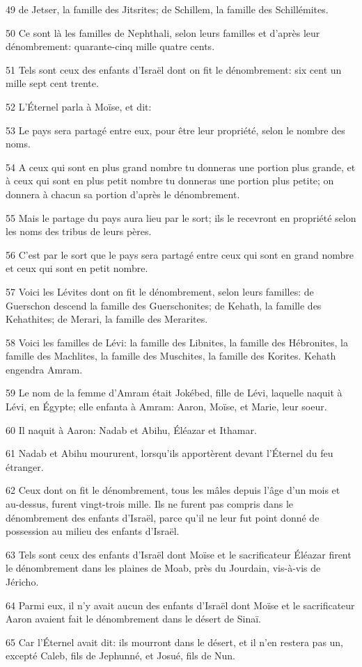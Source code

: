 \par 49 de Jetser, la famille des Jitsrites; de Schillem, la famille des Schillémites.
\par 50 Ce sont là les familles de Nephthali, selon leurs familles et d'après leur dénombrement: quarante-cinq mille quatre cents.
\par 51 Tels sont ceux des enfants d'Israël dont on fit le dénombrement: six cent un mille sept cent trente.
\par 52 L'Éternel parla à Moïse, et dit:
\par 53 Le pays sera partagé entre eux, pour être leur propriété, selon le nombre des noms.
\par 54 A ceux qui sont en plus grand nombre tu donneras une portion plus grande, et à ceux qui sont en plus petit nombre tu donneras une portion plus petite; on donnera à chacun sa portion d'après le dénombrement.
\par 55 Mais le partage du pays aura lieu par le sort; ils le recevront en propriété selon les noms des tribus de leurs pères.
\par 56 C'est par le sort que le pays sera partagé entre ceux qui sont en grand nombre et ceux qui sont en petit nombre.
\par 57 Voici les Lévites dont on fit le dénombrement, selon leurs familles: de Guerschon descend la famille des Guerschonites; de Kehath, la famille des Kehathites; de Merari, la famille des Merarites.
\par 58 Voici les familles de Lévi: la famille des Libnites, la famille des Hébronites, la famille des Machlites, la famille des Muschites, la famille des Korites. Kehath engendra Amram.
\par 59 Le nom de la femme d'Amram était Jokébed, fille de Lévi, laquelle naquit à Lévi, en Égypte; elle enfanta à Amram: Aaron, Moïse, et Marie, leur soeur.
\par 60 Il naquit à Aaron: Nadab et Abihu, Éléazar et Ithamar.
\par 61 Nadab et Abihu moururent, lorsqu'ils apportèrent devant l'Éternel du feu étranger.
\par 62 Ceux dont on fit le dénombrement, tous les mâles depuis l'âge d'un mois et au-dessus, furent vingt-trois mille. Ils ne furent pas compris dans le dénombrement des enfants d'Israël, parce qu'il ne leur fut point donné de possession au milieu des enfants d'Israël.
\par 63 Tels sont ceux des enfants d'Israël dont Moïse et le sacrificateur Éléazar firent le dénombrement dans les plaines de Moab, près du Jourdain, vis-à-vis de Jéricho.
\par 64 Parmi eux, il n'y avait aucun des enfants d'Israël dont Moïse et le sacrificateur Aaron avaient fait le dénombrement dans le désert de Sinaï.
\par 65 Car l'Éternel avait dit: ils mourront dans le désert, et il n'en restera pas un, excepté Caleb, fils de Jephunné, et Josué, fils de Nun.

